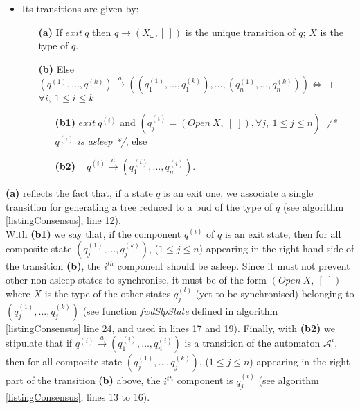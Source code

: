 \begin{itemize}
	\item Its transitions are given by:
	\begin{itemize} 
		\item[\textbf{(a)}] If $exit~ q$  then $q \rightarrow (X_\omega, [\,])$ is the unique transition of $q$; $X$ is the type of $q$.
		\item[\textbf{(b)}] Else  $\left(q^{(1)}, \ldots, q^{(k)}\right) \stackrel{a}{\rightarrow}\left(\left(q^{(1)}_1,\ldots,q^{(k)}_1\right),\ldots,\left(q^{(1)}_n,\ldots,q^{(k)}_n\right)\right) \Leftrightarrow$  +				$\forall i,~ 1\leq i\leq k$ 
		\begin{itemize} 
			\item[\textbf{(b1)}] $exit~q^{(i)}$ and $\left( q^{(i)}_j=\left(Open~X,~ [\;]\right), \forall j, ~1\leq j\leq n \right)~ $     \textit{ /*} $q^{(i)}$ \textit{is asleep */}, else\\
			\item[\textbf{(b2)}] ~  $q^{(i)}\stackrel{a}{\rightarrow}\left(q^{(i)}_1,\ldots,q^{(i)}_n \right)$.
		\end{itemize}
	\end{itemize}		
\end{itemize}
\textbf{(a)} reflects the fact that, if a state $q$ is an exit one, we associate a single transition for generating a tree reduced to a bud of the type of $q$ (see algorithm \ref{listingConsensus}, line 12).\\ 
With \textbf{(b1)} we say that, if the component $q^{(i)}$ of $q$ is an exit state, then for all composite state $\left(q^{(1)}_j,\ldots,q^{(k)}_j\right)$, ($1\leq j\leq n$) appearing in the right hand side of the transition \textbf{(b)}, the $i^{th}$ component should be asleep. Since it must not prevent other non-asleep states to synchronise, it must be of the form $(Open~X,~ [\;])$ where $X$ is the type of the other states $q^{(l)}_j$ (yet to be synchronised) belonging to $(q^{(1)}_j,\ldots,q^{(k)}_j)$ (see function \textit{fwdSlpState} defined in algorithm \ref{listingConsensus} line 24, and used in lines 17 and 19). Finally, with \textbf{(b2)} we stipulate that if  $q^{(i)}\stackrel{a}{\rightarrow}\left(q^{(i)}_1,\ldots,q^{(i)}_n \right)$ is a transition of the automaton $\mathcal{A}^{i} $, then for all composite state $\left(q^{(1)}_j,\ldots,q^{(k)}_j\right)$, ($1\leq j\leq n$) appearing in the right part of the transition \textbf{(b)} above, the $i^{th}$ component is $q^{(i)}_j$ (see algorithm \ref{listingConsensus}, lines 13 to 16).
			
